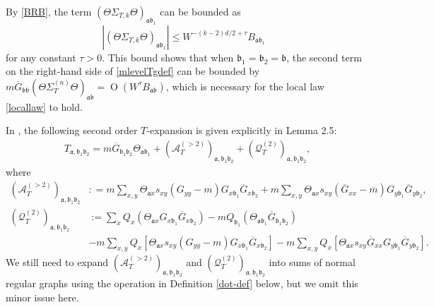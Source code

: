\documentclass{article}
\newcommand{\1}{\mathds{1}}
\numberwithin{equation}{section}
\newcommand{\al}{\alpha}
\newcommand{\be}{\begin{equation}}
\newcommand{\ee}{\end{equation}}
\newcommand{\fa}{{\mathfrak a}}
\newcommand{\fb}{{\mathfrak b}}
\renewcommand{\cal}{\mathcal}
\renewcommand{\leq}{\leqslant}
\renewcommand{\le}{\leq}
\DeclareMathOperator{\OO}{O}
\theoremstyle{plain} %
\theoremstyle{remark}
\newtheorem{remark}[theorem]{Remark}
\newcommand{\Sdelta}{{\Sigma}_T}
\newcommand{\Sdeltak}{{\Sigma}_{T,k}}
\newcommand{\PTn}{\mathcal R_T^{(n)}}
\newcommand{\QT}{\mathcal Q_T}
\newcommand{\AT}{\mathcal A_T}
\begin{document}




By \eqref{BRB}, the term $\left(\Theta \Sdeltak \Theta\right)_{\fa\fb_1}$ can be bounded as 
\be\label{intro_redagain}|\left(\Theta \Sdeltak \Theta\right)_{\fa\fb_1} |\le W^{-(k-2)d/2+\tau}B_{\fa\fb_1} \ee
for any constant $\tau>0$. This bound shows that when $\fb_1=\fb_2=\fb$, the second term on the right-hand side of \eqref{mlevelTgdef} can be bounded by  $m\overline G_{\fb\fb}(\Theta \Sdelta^{(n)} \Theta)_{\fa\fb}=\OO(W^\tau B_{\fa\fb})$, which is necessary for the local law \eqref{locallaw} to hold.


In \cite{PartI_high}, the following second order $T$-expansion is given explicitly in Lemma 2.5: 
\begin{align}\label{seconduniversal}
	& T_{\fa,\fb_1\fb_2}= %
	m \overline G_{\fb_1\fb_2}  \Theta_{\fa\fb_1}   + (\AT^{(>2)})_{\fa,\fb_1\fb_2} + (\QT^{(2)})_{\fa,\fb_1\fb_2}  ,
\end{align}
where 
\begin{align}
	(\AT^{(>2)})_{\fa,\fb_1\fb_2}& :  =  m\sum_{x,y} \Theta_{\fa x} s_{xy} (G_{yy}-m) G_{x \fb_1}\overline G_{x \fb_2}  + m \sum_{x,y} \Theta_{\fa x} s_{xy}  ( \overline G_{xx} - \overline m) G_{y \fb_1}\overline G_{y \fb_2}, \label{Aho>2}  \\
	(\QT^{(2)})_{\fa,\fb_1\fb_2}& := \sum_x Q_x\left(\Theta_{\fa x} G_{x \fb_1}   \overline G_{x \fb_2} \right) - m Q_{\fb_1} \left( \Theta_{\fa\fb_1} \overline G_{\fb_1 \fb_2}\right)  \nonumber\\
	& -  m\sum_{x,y} Q_x\left[\Theta_{\fa x} s_{xy} (G_{yy}-m) G_{x \fb_1} \overline G_{x \fb_2} \right] - m \sum_{x,y} Q_x\left[ \Theta_{\fa x} s_{xy}  \overline G_{xx} G_{y\fb_1}\overline G_{y\fb_2} \right] .\label{QT>2}
\end{align}
We still need to expand $(\AT^{(>2)})_{\fa,\fb_1\fb_2}$ and $(\QT^{(2)})_{\fa,\fb_1\fb_2} $ into sums of normal regular graphs using the operation in Definition \ref{dot-def} below, but we omit this minor issue here. 
\end{document}
